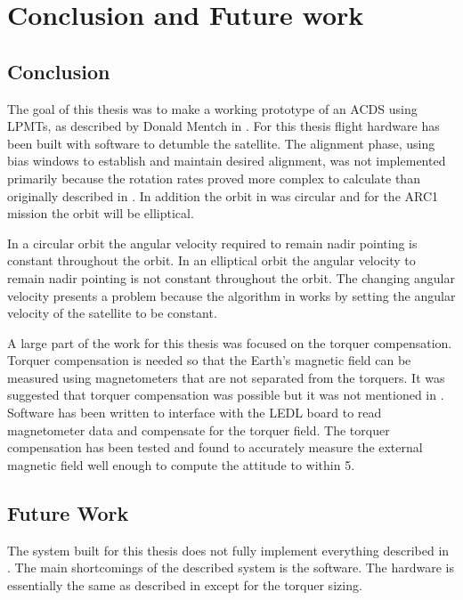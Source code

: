 
\chapter{Conclusion and Future work}

\section{Conclusion}

The goal of this thesis was to make a working prototype of an \ac{ACDS} using \acp{LPMT}, as described by Donald Mentch in \cite{Mentch11}. For this thesis flight hardware has been built with software to detumble the satellite. The alignment phase, using bias windows to establish and maintain desired alignment, was not implemented primarily because the rotation rates proved more complex to calculate than originally described in \cite{Mentch11}. In addition the orbit in \cite{Mentch11} was circular and for the \ac{ARC}1 mission the orbit will be elliptical.

In a circular orbit the angular velocity required to remain nadir pointing is constant throughout the orbit. In an elliptical orbit the angular velocity to remain nadir pointing is not constant throughout the orbit. The changing angular velocity presents a problem because the algorithm in \cite{Mentch11} works by setting the angular velocity of the satellite to be constant. 

A large part of the work for this thesis was focused on the torquer compensation. Torquer compensation is needed so that the Earth's magnetic field can be measured using magnetometers that are not separated from the torquers. It was suggested that torquer compensation was possible but it was not mentioned in \cite{Mentch11}. Software has been written to interface with the \ac{LEDL} board to read magnetometer data and compensate for the torquer field. The torquer compensation has been tested and found to accurately measure the external magnetic field well enough to compute the attitude to within \textpm{}5\textdegree.

\section{Future Work}

The system built for this thesis does not fully implement everything described in \cite{Mentch11}. The main shortcomings of the described system is the software. The hardware is essentially the same as described in \cite{Mentch11} except for the torquer sizing.

